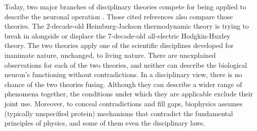  

Today, two major branches of disciplinary theories compete
for being applied to describe the neuronal operation \cite{CriticalElectricity:2018,ThermodynamicAPDrukarch:2022,PerspectivesNerveSignalPropagation:2024,ComparisonHHandSoliton:2010,HH_Potential_Controversies_2017,PiezoelectricNeuron:2025}. Those cited references also compare those theories.
The 2-decade-old Heimburg-Jackson thermodynamic theory is trying to break in alongside or displace the 7-decade-old all-electric Hodgkin-Huxley theory. The two theories apply one of the scientific disciplines developed for inanimate nature, unchanged, to living nature. There are unexplained observations for each of the two theories, and neither can describe the biological neuron's functioning without contradictions. 
In a disciplinary view, there is no chance of the two theories fusing. Although they can describe a wider range of phenomena together, the conditions under which they are applicable exclude their joint use. Moreover, to conceal contradictions and fill gaps, biophysics assumes (typically unspecified protein) mechanisms that contradict the fundamental principles of physics, and some of them even the disciplinary laws.




